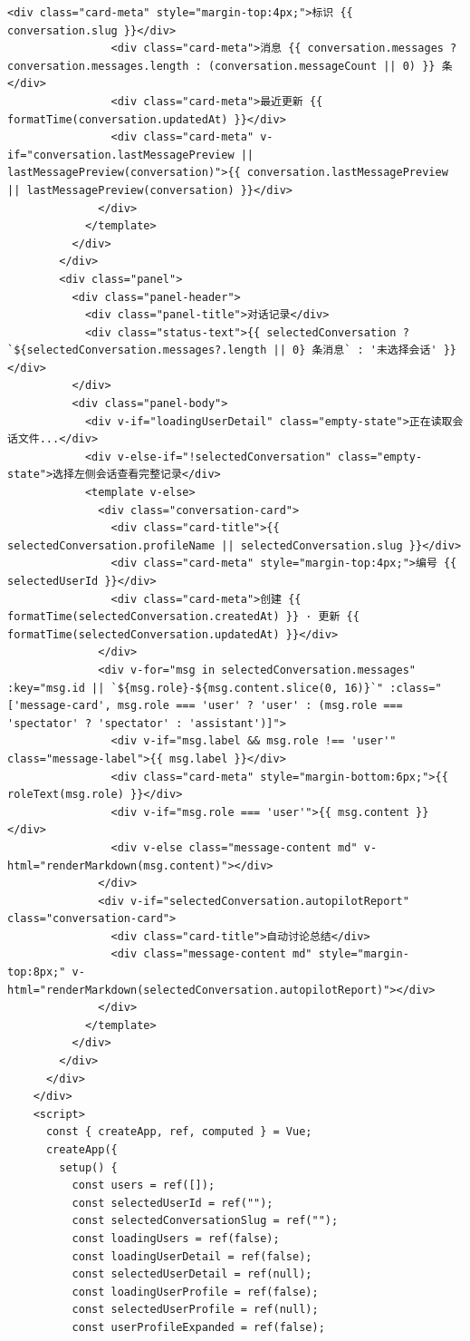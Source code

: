 \documentclass[12pt,a4paper]{article}
\begin{document}
\begin{Verbatim}[fontsize=\footnotesize]
                <div class="card-meta" style="margin-top:4px;">标识 {{ conversation.slug }}</div>
                <div class="card-meta">消息 {{ conversation.messages ? conversation.messages.length : (conversation.messageCount || 0) }} 条</div>
                <div class="card-meta">最近更新 {{ formatTime(conversation.updatedAt) }}</div>
                <div class="card-meta" v-if="conversation.lastMessagePreview || lastMessagePreview(conversation)">{{ conversation.lastMessagePreview || lastMessagePreview(conversation) }}</div>
              </div>
            </template>
          </div>
        </div>
        <div class="panel">
          <div class="panel-header">
            <div class="panel-title">对话记录</div>
            <div class="status-text">{{ selectedConversation ? `${selectedConversation.messages?.length || 0} 条消息` : '未选择会话' }}</div>
          </div>
          <div class="panel-body">
            <div v-if="loadingUserDetail" class="empty-state">正在读取会话文件...</div>
            <div v-else-if="!selectedConversation" class="empty-state">选择左侧会话查看完整记录</div>
            <template v-else>
              <div class="conversation-card">
                <div class="card-title">{{ selectedConversation.profileName || selectedConversation.slug }}</div>
                <div class="card-meta" style="margin-top:4px;">编号 {{ selectedUserId }}</div>
                <div class="card-meta">创建 {{ formatTime(selectedConversation.createdAt) }} · 更新 {{ formatTime(selectedConversation.updatedAt) }}</div>
              </div>
              <div v-for="msg in selectedConversation.messages" :key="msg.id || `${msg.role}-${msg.content.slice(0, 16)}`" :class="['message-card', msg.role === 'user' ? 'user' : (msg.role === 'spectator' ? 'spectator' : 'assistant')]">
                <div v-if="msg.label && msg.role !== 'user'" class="message-label">{{ msg.label }}</div>
                <div class="card-meta" style="margin-bottom:6px;">{{ roleText(msg.role) }}</div>
                <div v-if="msg.role === 'user'">{{ msg.content }}</div>
                <div v-else class="message-content md" v-html="renderMarkdown(msg.content)"></div>
              </div>
              <div v-if="selectedConversation.autopilotReport" class="conversation-card">
                <div class="card-title">自动讨论总结</div>
                <div class="message-content md" style="margin-top:8px;" v-html="renderMarkdown(selectedConversation.autopilotReport)"></div>
              </div>
            </template>
          </div>
        </div>
      </div>
    </div>
    <script>
      const { createApp, ref, computed } = Vue;
      createApp({
        setup() {
          const users = ref([]);
          const selectedUserId = ref("");
          const selectedConversationSlug = ref("");
          const loadingUsers = ref(false);
          const loadingUserDetail = ref(false);
          const selectedUserDetail = ref(null);
          const loadingUserProfile = ref(false);
          const selectedUserProfile = ref(null);
          const userProfileExpanded = ref(false);
\end{Verbatim}
\end{document}
